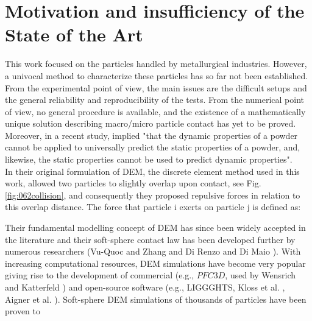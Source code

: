 
\chapter{Motivation and insufficiency of the State of the Art}
\label{cap:insufficiency}

This work focused on the particles handled by metallurgical industries.
However, a univocal
method to characterize these particles has so far not been established.
From the experimental point of view, the main issues are the difficult setups and the general 
reliability and reproducibility of the tests. 
From the numerical point of view, no general procedure is available, and the existence of a 
mathematically unique solution describing macro/micro particle contact has yet to be proved.
Moreover, in a recent study, \citet{RefWorks:56} implied "that the dynamic properties of a 
powder cannot be applied to universally predict the static properties of a powder, and, likewise, 
the static properties cannot be used to predict dynamic properties".\\
In their original formulation of \acs{DEM}, the discrete element method used in
this work, \citet{RefWorks:172} allowed two particles to slightly overlap upon
contact, see Fig. \ref{fig:062collision}, and consequently they proposed
repulsive forces in relation to this overlap distance.
The force that particle i exerts on particle j is defined as:


Their fundamental modelling concept of \acs{DEM} has
since been widely accepted in the literature and their soft-sphere contact law has been developed further by
numerous researchers (Vu-Quoc and Zhang \cite{RefWorks:148} and Di Renzo and Di Maio \cite{RefWorks:145}). 
With increasing computational resources, \acs{DEM} simulations have become very
popular giving rise to the development of commercial (e.g., $PFC3D$, used by
Wensrich and Katterfeld \cite{RefWorks:87}) and open-source software (e.g.,
\acs{LIGGGHTS}, Kloss et al. \cite{RefWorks:136}, Aigner et al. \cite{RefWorks:139}).
Soft-sphere \acs{DEM} simulations of thousands of particles have been proven to 
